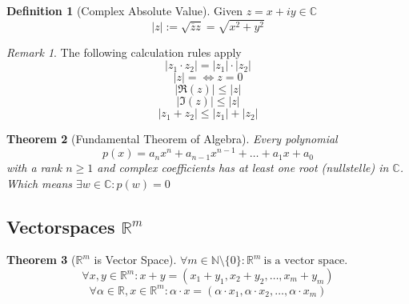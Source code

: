 \documentclass[english,titlepage]{uzhpub}
\theoremstyle{definition}
\newtheorem{definition}{Definition}[section]
\theoremstyle{plain}
\newtheorem{theorem}[definition]{Theorem} %
\theoremstyle{remark}
\newtheorem*{remark}{Remark}
\theoremstyle{example}
\begin{document}
   \begin{definition}[Complex Absolute Value]
      Given \(z = x + iy \in \mathbb{C}\)
      \[|z| := \sqrt{\overline{z}z} = \sqrt{x^2 + y^2}\]
   \end{definition}
   \begin{remark}
      The following calculation rules apply
      \[|z_1 \cdot z_2| = |z_1| \cdot |z_2|\]
      \[|z| = \iff z = 0\]
      \[|\Re(z)| \leq |z|\]
      \[|\Im(z)| \leq |z|\]
      \[|z_1 + z_2| \leq |z_1| + |z_2|\]
   \end{remark}


   \begin{theorem}[Fundamental Theorem of Algebra]
      Every polynomial
      \[p(x) = a_nx^n + a_{n-1}x^{n-1} + \ldots + a_1x + a_0\]
      with a rank \(n \geq 1\) and complex coefficients has at least one root (nullstelle) in \(\mathbb{C}\).
      Which means \(\exists w \in \mathbb{C}: p(w) = 0\)
   \end{theorem}

   \subsection{Vectorspaces \texorpdfstring{\(\mathbb{R}^m\)}{R(m)}}
   \begin{theorem}[\(\mathbb{R}^m\) is Vector Space]
      \(\forall m \in \mathbb{N} \setminus \{0\}: \mathbb{R}^m~\text{is a vector space.}\)
      \[\forall x, y \in \mathbb{R}^m: x + y = (x_1 + y_1, x_2 + y_2, \ldots, x_m + y_m)\]
      \[\forall \alpha \in \mathbb{R}, x \in \mathbb{R}^m: \alpha \cdot x = (\alpha \cdot x_1, \alpha \cdot x_2, \ldots, \alpha \cdot x_m)\]
   \end{theorem}
\end{document}

